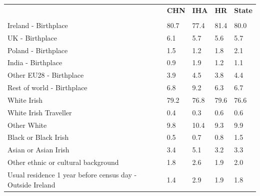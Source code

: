 \documentclass{article}
\begin{document}
\pagebreak
\begin{table}[h]	
\centering
		\begin{tabular}{KTTTT}
  \hline
& \textbf{CHN} & \textbf{IHA} & \textbf{HR}& \textbf{State}\\ 
  \hline
    \\ 
    \hline
Ireland - Birthplace & 80.7& 77.4& 81.4& 80.0\\
UK - Birthplace & 6.1& 5.7& 5.6& 5.7\\
Poland - Birthplace & 1.5& 1.2& 1.8& 2.1\\
India - Birthplace & 0.9& 1.9& 1.2& 1.1\\
Other EU28 - Birthplace & 3.9& 4.5& 3.8& 4.4\\
Rest of world - Birthplace & 6.8& 9.2& 6.3& 6.7\\
    \hline
White Irish & 79.2& 76.8& 79.6& 76.6\\
White Irish Traveller & 0.4& 0.3& 0.6& 0.6\\
Other White &  9.8& 10.4&  9.3&  9.9\\
Black or Black Irish & 0.5& 0.7& 0.8& 1.5\\
Asian or Asian Irish & 3.4& 5.1& 3.2& 3.3\\
Other ethnic or cultural background & 1.8& 2.6& 1.9& 2.0\\
    \hline
Usual residence 1 year before census day - Outside Ireland & 1.4& 2.9& 1.9& 1.8\\


\end{tabular}
\end{table}
\end{document}
